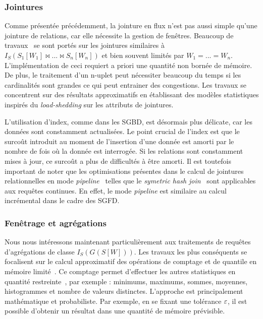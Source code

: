 \subsubsection{Jointures}
Comme présentée précédemment, la jointure en flux n'est pas aussi simple qu'une jointure de relations, car elle nécessite la gestion de fenêtres. Beaucoup de travaux~\cite{Han:join, Srivastava:join, Law:join} se sont portés sur les jointures similaires à $I_S (S_1[W_1] \Join ... \Join S_n[W_n])$ et bien souvent limités par $W_1=...=W_n$. L'implémentation de ceci requiert a priori une quantité non bornée de mémoire. De plus, le traitement d'un n-uplet peut nécessiter beaucoup du temps si les cardinalités sont grandes ce qui peut entrainer des congestions. Les travaux se concentrent sur des résultats approximatifs en établissant des modèles statistiques inspirés du \textit{load-shedding} sur les attributs de jointures.

L'utilisation d'index, comme dans les SGBD, est désormais plus délicate, car les données sont constamment actualisées. Le point crucial de l'index est que le surcoût introduit au moment de l'insertion d'une donnée est amorti par le nombre de fois où la donnée est interrogée. Si les relations sont constamment mises à jour, ce surcoût a plus de difficultés à être amorti. Il est toutefois important de noter que les optimisations présentes dans le calcul de jointures relationnelles en mode \textit{pipeline}~\cite{Gajski:pipeline} telles que le \textit{symetric hash join}~\cite{Wilschut:symetricjoin} sont applicables aux requêtes continues. En effet, le mode \textit{pipeline} est similaire au calcul incrémental dans le cadre des SGFD.

\subsubsection{Fenêtrage et agrégations}\label{sec:rw:sgfd:optim:fenetres}
Nous nous intéressons maintenant particulièrement aux traitements de requêtes d'agrégations de classe $I_S(G(S[W]))$. Les travaux les plus conséquents se focalisent sur le calcul approximatif des opérations de comptage et de quantile en mémoire limité~\cite{Arasu:window}. Ce comptage permet d'effectuer les autres statistiques en quantité restreinte~\cite{Datar:stats}, par exemple : minimums, maximums, sommes, moyennes, histogrammes et nombre de valeurs distinctes. L'approche est principalement mathématique et probabiliste. Par exemple, en se fixant une tolérance $\varepsilon$, il est possible d'obtenir un résultat dans une quantité de mémoire prévisible. 

